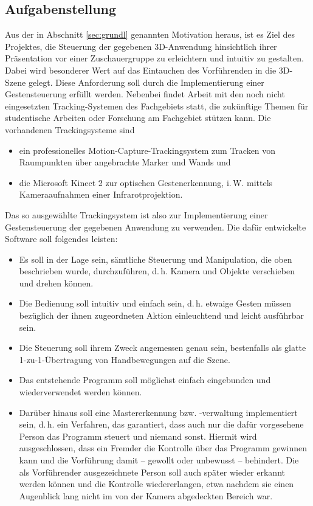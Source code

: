 \subsection{Aufgabenstellung}\label{sec:aufg}
Aus der in Abschnitt \ref{sec:grundl} genannten Motivation heraus, ist es Ziel des Projektes, die Steuerung der gegebenen 3D-Anwendung hinsichtlich ihrer Präsentation vor einer Zuschauergruppe zu erleichtern und intuitiv zu gestalten. Dabei wird besonderer Wert auf das Eintauchen des Vorführenden in die 3D-Szene gelegt. Diese Anforderung soll durch die Implementierung einer Gestensteuerung erfüllt werden. Nebenbei findet Arbeit mit den noch nicht eingesetzten Tracking-Systemen des Fachgebiets statt, die zukünftige Themen für studentische Arbeiten oder Forschung am Fachgebiet stützen kann. Die vorhandenen Trackingsysteme sind
\begin{itemize}
\item ein professionelles Motion-Capture-Trackingsystem zum Tracken von Raumpunkten über angebrachte Marker und Wands und
\item die Microsoft Kinect 2 zur optischen Gestenerkennung, i.\,W. mittels Kameraaufnahmen einer Infrarotprojektion.
\end{itemize}
Das so ausgewählte Trackingsystem ist also zur Implementierung einer Gestensteuerung der gegebenen Anwendung zu verwenden. Die dafür entwickelte Software soll folgendes leisten:
\begin{itemize}
\item Es soll in der Lage sein, sämtliche Steuerung und Manipulation, die oben beschrieben wurde, durchzuführen, d.\,h. Kamera und Objekte verschieben und drehen können.
\item Die Bedienung soll intuitiv und einfach sein, d.\,h. etwaige Gesten müssen bezüglich der ihnen zugeordneten Aktion einleuchtend und leicht ausführbar sein.
\item Die Steuerung soll ihrem Zweck angemessen genau sein, bestenfalls als glatte 1-zu-1-Übertragung von Handbewegungen auf die Szene.
\item Das entstehende Programm soll möglichst einfach eingebunden und wiederverwendet werden können.
\item Darüber hinaus soll eine Mastererkennung bzw. -verwaltung implementiert sein, d.\,h. ein Verfahren, das garantiert, dass auch nur die dafür vorgesehene Person das Programm steuert und niemand sonst. Hiermit wird ausgeschlossen, dass ein Fremder die Kontrolle über das Programm gewinnen kann und die Vorführung damit -- gewollt oder unbewusst -- behindert. Die als Vorführender ausgezeichnete Person soll auch später wieder erkannt werden können und die Kontrolle wiedererlangen, etwa nachdem sie einen Augenblick lang nicht im von der Kamera abgedeckten Bereich war.
\end{itemize}
